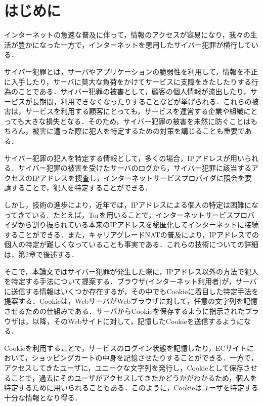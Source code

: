 \documentclass[10pt, a4paper]{jreport}
\begin{document}

\tableofcontents

\chapter{はじめに}
\setcounter{page}{1}
インターネットの急速な普及に伴って，情報のアクセスが容易になり，我々の生活が豊かになった一方で，インターネットを悪用したサイバー犯罪が横行している．

サイバー犯罪とは，サーバやアプリケーションの脆弱性を利用して，情報を不正に入手したり，サーバに莫大な負荷をかけてサービスに支障をきたしたりする行為のことである．サイバー犯罪の被害として，顧客の個人情報が流出したり，サービスが長期間，利用できなくなったりすることなどが挙げられる．これらの被害は，サービスを利用する顧客にとっても，サービスを運営する企業や組織にとっても大きな損失となる．そのため，サイバー犯罪の被害を未然に防ぐことはもちろん，被害に遭った際に犯人を特定するための対策を講じることも重要である．

サイバー犯罪の犯人を特定する情報として，多くの場合，IPアドレスが用いられる．サイバー犯罪の被害を受けたサーバのログから，サイバー犯罪に該当するアクセスのIPアドレスを捜査し，インターネットサービスプロバイダに照会を要請することで，犯人を特定することができる．

しかし，技術の進歩により，近年では，IPアドレスによる個人の特定は困難になってきている．たとえば，Torを用いることで，インターネットサービスプロバイダから割り振られている本来のIPアドレスを秘匿化してインターネットに接続することができる．また，キャリアグレードNATの普及により，IPアドレスでの個人の特定が難しくなっていることも事実である．これらの技術についての詳細は，第2章で後述する．

そこで，本論文ではサイバー犯罪が発生した際に，IPアドレス以外の方法で犯人を特定する手法について提案する．ブラウザ(インターネット利用者)が，サーバに送信する情報はいくつか存在するが，その中でもCookieに着目した特定手法を提案する．Cookieは，WebサーバがWebブラウザに対して，任意の文字列を記憶させるための仕組みである．サーバからCookieを保存するように指示されたブラウザは，以降，そのWebサイトに対して，記憶したCookieを送信するようになる．

Cookieを利用することで，サービスのログイン状態を記憶したり，ECサイトにおいて，ショッピングカートの中身を記憶させたりすることができる．一方で，アクセスしてきたユーザに，ユニークな文字列を発行し，Cookieとして保存させることで，過去にそのユーザがアクセスしてきたかどうかがわかるため，個人を特定するために用いられることもある．このように，Cookieはユーザを特定する十分な情報となり得る．
\end{document}
